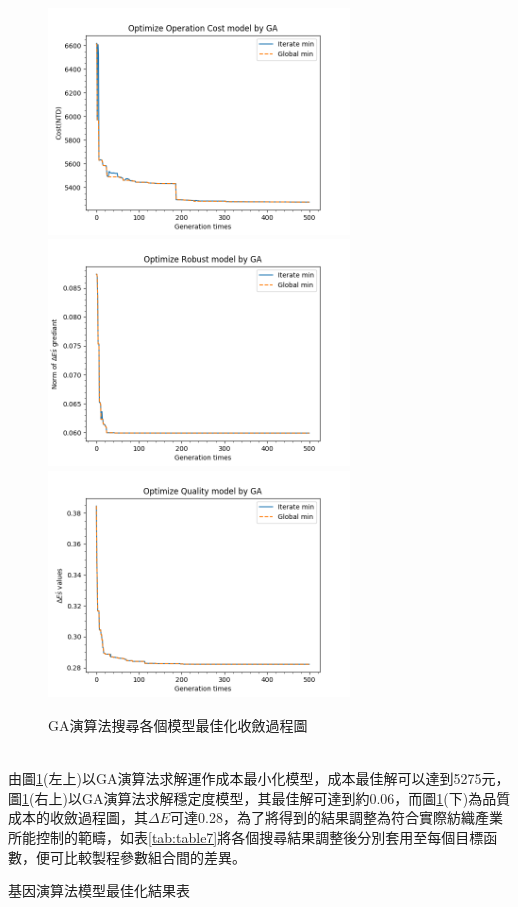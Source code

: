 \begin{figure}[!htb]
\includegraphics[width=8cm,height=6cm]{Graph/GAcost.png}
\includegraphics[width=8cm,height=6cm]{Graph/GARobust.png}
\center
\includegraphics[width=8cm,height=6cm]{Graph/GADeltaE.png}
\caption{GA演算法搜尋各個模型最佳化收斂過程圖}
\label{fig:GAopt}
\end{figure}
\\由圖\ref{fig:GAopt}(左上)以GA演算法求解運作成本最小化模型，成本最佳解可以達到5275元，圖\ref{fig:GAopt}(右上)以GA演算法求解穩定度模型，其最佳解可達到約0.06，而圖\ref{fig:GAopt}(下)為品質成本的收斂過程圖，其$\Delta E$可達0.28，為了將得到的結果調整為符合實際紡織產業所能控制的範疇，如表\ref{tab:table7}將各個搜尋結果調整後分別套用至每個目標函數，便可比較製程參數組合間的差異。
\begin{table}[!htbp]
	\caption{基因演算法模型最佳化結果表}
	\center
	
	\label{tab:table7}
\end{table}




